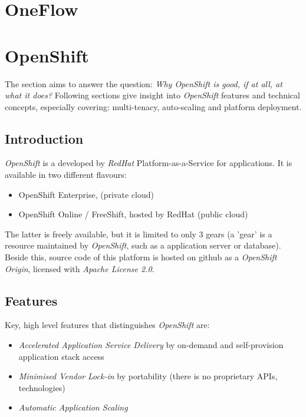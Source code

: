 \section{OneFlow}

\section{OpenShift}
The section aims to answer the question: \emph{Why OpenShift is good, if at all, at what it does?} Following sections give insight into \emph{OpenShift} \cite{OpenShift} features and technical concepts, especially covering: multi-tenacy, auto-scaling and platform deployment.

\subsection{Introduction}
\emph{OpenShift} is a developed by \emph{RedHat} Platform-as-a-Service for applications. It is available in two different flavours:
\begin{itemize}
 \item OpenShift Enterprise, (private cloud)
 \item OpenShift Online / FreeShift, hosted by RedHat (public cloud)
\end{itemize}

The latter is freely available, but it is limited to only 3 gears (a 'gear' is a resource maintained by \emph{OpenShift}, such as a application server or database). Beside this, source code of this platform is hosted on github as a \emph{OpenShift Origin}, licensed with \emph{Apache License 2.0}.

\subsection{Features}
Key, high level features that distinguishes \emph{OpenShift} are:
\begin{itemize}
  \item \emph{Accelerated Application Service Delivery} by on-demand and self-provision application stack access
  \item \emph{Minimised Vendor Lock-in} by portability (there is no proprietary APIs, technologies)
  \item \emph{Automatic Application Scaling}
\end{itemize}

